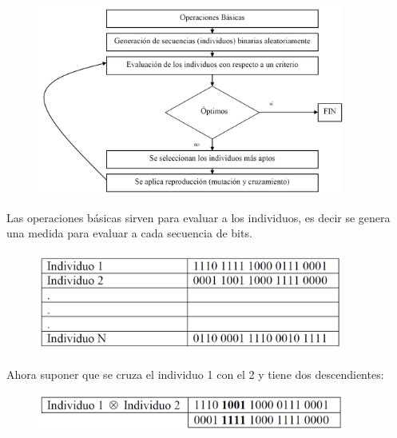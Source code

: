 \begin{figure}[h!]
	\centering
	\includegraphics[width=0.9\textwidth]{images/img82.png}
	\label{figura82}
\end{figure}

Las operaciones básicas sirven para evaluar a los individuos, es decir se genera una medida para evaluar a
cada secuencia de bits.
% 
%
% 
% 		

\begin{figure}[h!]
\centering
\includegraphics[width=0.9\textwidth]{images/img83.png}
\label{figura83}
\end{figure}
\break 


Ahora suponer que se cruza el individuo 1 con el 2 y tiene dos descendientes:

\begin{figure}[h!]
	\centering
	\includegraphics[width=0.9\textwidth]{images/img84.png}
	\label{figura84}
\end{figure}

